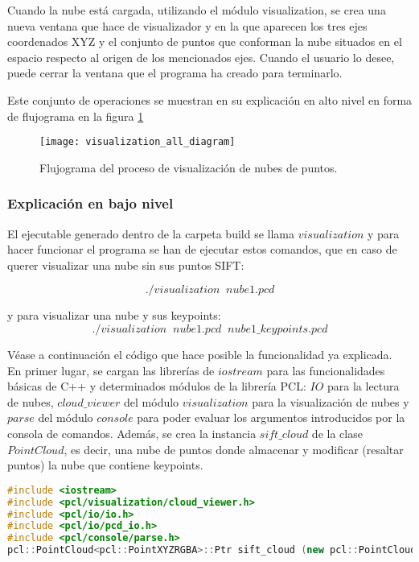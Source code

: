 Cuando la nube está cargada, utilizando el módulo visualization, se crea una nueva ventana que hace de visualizador y en la que aparecen los tres ejes coordenados XYZ y el conjunto de puntos que conforman la nube situados en el espacio respecto al origen de los mencionados ejes. Cuando el usuario lo desee, puede cerrar la ventana que el programa ha creado para terminarlo.

Este conjunto de operaciones se muestran en su explicación en alto nivel en forma de flujograma en la figura \ref{fig:visualization_all_diagram}

\begin{figure}
\centering
\texttt{[image: visualization\_all\_diagram]}
\caption{Flujograma del proceso de visualización de nubes de puntos.}\label{fig:visualization_all_diagram}
\end{figure}


\subsubsection{Explicación en bajo nivel}
El ejecutable generado dentro de la carpeta build se llama $visualization$ y para hacer funcionar el programa se han de ejecutar estos comandos, que en caso de querer visualizar una nube sin sus puntos SIFT:

$$./visualization \;\; nube1.pcd$$

y para visualizar una nube y sus keypoints:
$$./visualization \;\; nube1.pcd \;\; nube1\_keypoints.pcd$$

Véase a continuación el código que hace posible la funcionalidad ya explicada.\\

En primer lugar, se cargan las librerías de $iostream$ para las funcionalidades básicas de C++ y determinados módulos de la librería PCL: $IO$ para la lectura de nubes, $cloud\_viewer$ del módulo $visualization$ para la visualización de nubes y $parse$ del módulo $console$ para poder evaluar los argumentos introducidos por la consola de comandos.
Además, se crea la instancia $sift\_cloud$ de la clase $PointCloud$, es decir, una nube de puntos donde almacenar y modificar (resaltar puntos) la nube que contiene keypoints.

\begin{lstlisting}[language=C++,breaklines]
#include <iostream>
#include <pcl/visualization/cloud_viewer.h>
#include <pcl/io/io.h>
#include <pcl/io/pcd_io.h>
#include <pcl/console/parse.h>
pcl::PointCloud<pcl::PointXYZRGBA>::Ptr sift_cloud (new pcl::PointCloud<pcl::PointXYZRGBA>);
\end{lstlisting}

